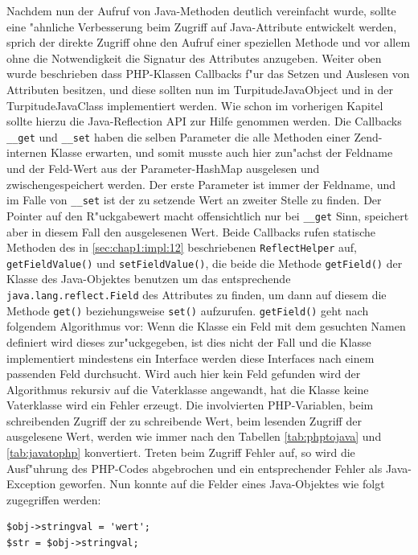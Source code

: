 Nachdem nun der Aufruf von Java-Methoden deutlich vereinfacht wurde, sollte eine "ahnliche Verbesserung beim Zugriff auf Java-Attribute
entwickelt werden, sprich der direkte Zugriff ohne den Aufruf einer speziellen Methode und vor allem ohne die Notwendigkeit die
Signatur des Attributes anzugeben. Weiter oben wurde beschrieben dass PHP-Klassen Callbacks f"ur das Setzen und Auslesen von 
Attributen besitzen, und diese sollten nun im TurpitudeJavaObject und in der TurpitudeJavaClass implementiert werden. Wie schon
im vorherigen Kapitel sollte hierzu die Java-Reflection API zur Hilfe genommen werden. Die Callbacks \texttt{\_\_get} und \texttt{\_\_set}
haben die selben Parameter die alle Methoden einer Zend-internen Klasse erwarten, und somit musste auch hier zun"achst der Feldname
und der Feld-Wert aus der Parameter-HashMap ausgelesen und zwischengespeichert werden. Der erste Parameter ist immer der Feldname,
und im Falle von \texttt{\_\_set} ist der zu setzende Wert an zweiter Stelle zu finden. Der Pointer auf den R"uckgabewert macht 
offensichtlich nur bei \texttt{\_\_get} Sinn, speichert aber in diesem Fall den ausgelesenen Wert. Beide Callbacks rufen statische Methoden
des in \ref{sec:chap1:impl:12} beschriebenen \texttt{ReflectHelper} auf, \texttt{getFieldValue()} und \texttt{setFieldValue()}, die beide
die Methode \texttt{getField()} der Klasse des Java-Objektes benutzen um das entsprechende \texttt{java.lang.reflect.Field} des Attributes 
zu finden, um dann auf diesem die Methode \texttt{get()} beziehungsweise \texttt{set()} aufzurufen. \texttt{getField()} geht nach folgendem
Algorithmus vor: Wenn die Klasse ein Feld mit dem gesuchten Namen definiert wird dieses zur"uckgegeben, ist dies nicht der Fall und die
Klasse implementiert mindestens ein Interface werden diese Interfaces nach einem passenden Feld durchsucht. Wird auch hier kein Feld
gefunden wird der Algorithmus rekursiv auf die Vaterklasse angewandt, hat die Klasse keine Vaterklasse wird ein Fehler erzeugt.
Die involvierten PHP-Variablen, beim
schreibenden Zugriff der zu schreibende Wert, beim lesenden Zugriff der ausgelesene Wert, werden wie immer nach den Tabellen
\ref{tab:phptojava} und \ref{tab:javatophp} konvertiert. Treten beim Zugriff Fehler auf, so wird die Ausf"uhrung des PHP-Codes abgebrochen
und ein entsprechender Fehler als Java-Exception geworfen. Nun konnte auf die Felder eines Java-Objektes wie folgt zugegriffen werden:

\begin{lstlisting}[caption=Verbesserter Zugriff auf Java-Attribute]
$obj->stringval = 'wert';
$str = $obj->stringval;
\end{lstlisting}

